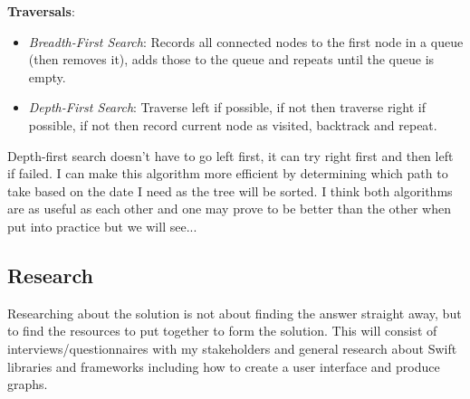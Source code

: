 \documentclass{article}
\begin{document}
\textbf{Traversals}:
\begin{itemize}
    \item \textit{Breadth-First Search}: Records all connected nodes to the first node in a queue (then removes it), adds those to the queue and repeats until the queue is empty.
    \item \textit{Depth-First Search}: Traverse left if possible, if not then traverse right if possible, if not then record current node as visited, backtrack and repeat.
\end{itemize}
Depth-first search doesn't have to go left first, it can try right first and then left if failed. I can make this algorithm more efficient by determining which path to take based on the date I need as the tree will be sorted. I think both algorithms are as useful as each other and one may prove to be better than the other when put into practice but we will see...

\subsection{Research}
Researching about the solution is not about finding the answer straight away, but to find the resources to put together to form the solution. This will consist of interviews/questionnaires with my stakeholders and general research about Swift libraries and frameworks including how to create a user interface and produce graphs.
\end{document}
